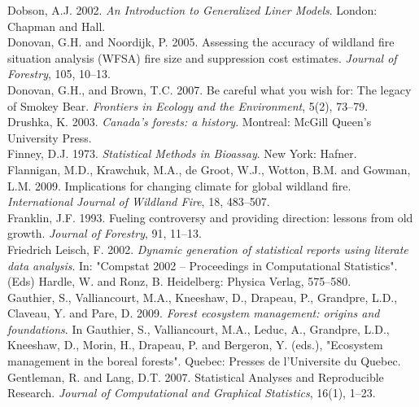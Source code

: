 \begin{spacing}{1.5}
\noindent Dobson, A.J. 2002. \emph{An Introduction to Generalized Liner Models}. London: Chapman and Hall.\\

\noindent Donovan, G.H. and Noordijk, P. 2005. Assessing the accuracy of wildland fire situation analysis (WFSA) fire size and suppression cost estimates. \emph{Journal of Forestry}, 105, 10--13.\\

\noindent Donovan, G.H., and Brown, T.C. 2007. Be careful what you wish for: The legacy of Smokey Bear. \emph{Frontiers in Ecology and the Environment}, 5(2), 73--79.\\

\noindent Drushka, K. 2003. \emph{Canada's forests: a history}. Montreal: McGill Queen's University Press.\\

\noindent Finney, D.J. 1973. \emph{Statistical Methods in Bioassay}. New York: Hafner.\\

\noindent Flannigan, M.D., Krawchuk, M.A., de Groot, W.J., Wotton, B.M. and Gowman, L.M. 2009. Implications for changing climate for global wildland fire. \emph{International Journal of Wildland Fire}, 18, 483--507.\\

\noindent Franklin, J.F. 1993. Fueling controversy and providing direction: lessons from old growth. \emph{Journal of Forestry}, 91, 11--13.\\

\noindent Friedrich Leisch, F. 2002. \emph{Dynamic generation of statistical reports using literate data analysis}. In: "Compstat 2002 -- Proceedings in Computational Statistics". (Eds) Hardle, W. and Ronz, B. Heidelberg: Physica Verlag, 575--580. \\

\noindent Gauthier, S., Valliancourt, M.A., Kneeshaw, D., Drapeau, P., Grandpre, L.D., Claveau, Y. and Pare, D. 2009. \emph{Forest ecosystem management: origins and foundations}. In Gauthier, S., Valliancourt, M.A., Leduc, A., Grandpre, L.D., Kneeshaw, D., Morin, H., Drapeau, P. and Bergeron, Y. (eds.), "Ecosystem management in the boreal forests". Quebec: Presses de l'Universite  du  Quebec.\\

\noindent Gentleman, R. and Lang, D.T. 2007. Statistical Analyses and Reproducible Research. \emph{Journal of Computational and Graphical Statistics}, 16(1), 1--23.\\


\end{spacing}
